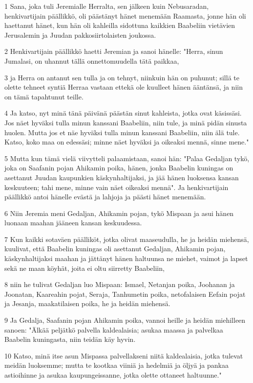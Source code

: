 \par 1 Sana, joka tuli Jeremialle Herralta, sen jälkeen kuin Nebusaradan, henkivartijain päällikkö, oli päästänyt hänet menemään Raamasta, jonne hän oli haettanut hänet, kun hän oli kahleilla sidottuna kaikkien Baabeliin vietävien Jerusalemin ja Juudan pakkosiirtolaisten joukossa.
\par 2 Henkivartijain päällikkö haetti Jeremian ja sanoi hänelle: "Herra, sinun Jumalasi, on uhannut tällä onnettomuudella tätä paikkaa,
\par 3 ja Herra on antanut sen tulla ja on tehnyt, niinkuin hän on puhunut; sillä te olette tehneet syntiä Herraa vastaan ettekä ole kuulleet hänen ääntänsä, ja niin on tämä tapahtunut teille.
\par 4 Ja katso, nyt minä tänä päivänä päästän sinut kahleista, jotka ovat käsissäsi. Jos näet hyväksi tulla minun kanssani Baabeliin, niin tule, ja minä pidän sinusta huolen. Mutta jos et näe hyväksi tulla minun kanssani Baabeliin, niin älä tule. Katso, koko maa on edessäsi; minne näet hyväksi ja oikeaksi mennä, sinne mene."
\par 5 Mutta kun tämä vielä viivytteli palaamistaan, sanoi hän: "Palaa Gedaljan tykö, joka on Saafanin pojan Ahikamin poika, hänen, jonka Baabelin kuningas on asettanut Juudan kaupunkien käskynhaltijaksi, ja jää hänen luoksensa kansan keskuuteen; tahi mene, minne vain näet oikeaksi mennä". Ja henkivartijain päällikkö antoi hänelle evästä ja lahjoja ja päästi hänet menemään.
\par 6 Niin Jeremia meni Gedaljan, Ahikamin pojan, tykö Mispaan ja asui hänen luonaan maahan jääneen kansan keskuudessa.
\par 7 Kun kaikki sotaväen päälliköt, jotka olivat maaseudulla, he ja heidän miehensä, kuulivat, että Baabelin kuningas oli asettanut Gedaljan, Ahikamin pojan, käskynhaltijaksi maahan ja jättänyt hänen haltuunsa ne miehet, vaimot ja lapset sekä ne maan köyhät, joita ei oltu siirretty Baabeliin,
\par 8 niin he tulivat Gedaljan luo Mispaan: Ismael, Netanjan poika, Joohanan ja Joonatan, Kaareahin pojat, Seraja, Tanhumetin poika, netofalaisen Eefain pojat ja Jesanja, maakatilaisen poika, he ja heidän miehensä.
\par 9 Ja Gedalja, Saafanin pojan Ahikamin poika, vannoi heille ja heidän miehilleen sanoen: "Älkää peljätkö palvella kaldealaisia; asukaa maassa ja palvelkaa Baabelin kuningasta, niin teidän käy hyvin.
\par 10 Katso, minä itse asun Mispassa palvellakseni niitä kaldealaisia, jotka tulevat meidän luoksemme; mutta te kootkaa viiniä ja hedelmiä ja öljyä ja pankaa astioihinne ja asukaa kaupungeissanne, jotka olette ottaneet haltuunne."
